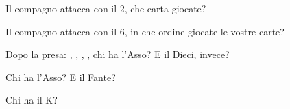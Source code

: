 \documentclass[../corsofiori.tex]{subfiles}
\begin{document}
\begin{minipage}{.45\textwidth}

Il compagno attacca con il 2, che carta giocate?
\end{minipage}\hfill
\begin{minipage}{.45\textwidth}

    Il compagno attacca con il 6, in che ordine giocate le vostre carte?
\end{minipage}\hfill

\bigskip
\hspace{-.7cm}
\begin{minipage}{.45\textwidth}

    Dopo la presa: , , , , chi ha l'Asso? E il
    Dieci, invece?  
\end{minipage}\hfill\qquad
\begin{minipage}{.45\textwidth}

Chi ha l'Asso? E il Fante?
\end{minipage}\hfill
\bigskip

\hspace{-.7cm}
\begin{minipage}{.45\textwidth}

    Chi ha il K?
\end{minipage}\hfill
\end{document}
